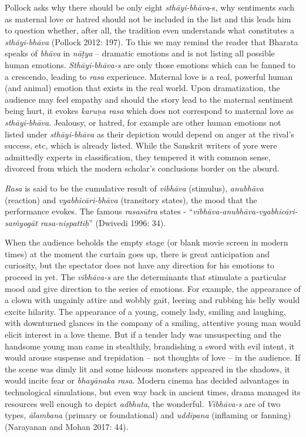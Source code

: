 Pollock asks why there should be only eight \textit{sthāyi-bhāva}-s, why sentiments such as maternal love or hatred should not be included in the list and this leads him to question whether, after all, the tradition even understands what constitutes a \textit{sthāyi-bhāva }(Pollock 2012: 197). To this we may remind the reader that Bharata speaks of \textit{bhāva} in \textit{nāṭya} – dramatic emotions and is not listing all possible human emotions. \textit{Sthāyi-bhāva-s} are only those emotions which can be fanned to a crescendo, leading to \textit{rasa} experience. Maternal love is a real, powerful human (and animal) emotion that exists in the real world. Upon dramatization, the audience may feel empathy and should the story lead to the maternal sentiment being hurt, it evokes \textit{karuṇa rasa} which does not correspond to maternal love as \textit{sthāyi-bhāva}. Jealousy, or hatred, for example are other human emotions not listed under \textit{sthāyi-bhāva} as their depiction would depend on anger at the rival’s success, etc, which is already listed. While the Sanskrit writers of yore were admittedly experts in classification, they tempered it with common sense, divorced from which the modern scholar’s conclusions border on the absurd.

\textit{Rasa} is said to be the cumulative result of \textit{vibhāva} (stimulus), \textit{anubhāva} (reaction) and \textit{vyabhicāri-bhāva} (transitory states), the mood that the performance evokes. The famous \textit{rasasūtra} states - “\textit{vibhāva-anubhāva-vyabhicāri-saṁyogāt rasa-niṣpattiḥ}” (Dwivedi 1996: 34).

When the audience beholds the empty stage (or blank movie screen in modern times) at the moment the curtain goes up, there is great anticipation and curiosity, but the spectator does not have any direction for his emotions to proceed in yet. The \textit{vibhāva-s} are the determinants that stimulate a particular mood and give direction to the series of emotions. For example, the appearance of a clown with ungainly attire and wobbly gait, leering and rubbing his belly would excite hilarity. The appearance of a young, comely lady, smiling and laughing, with downturned glances in the company of a smiling, attentive young man would elicit interest in a love theme. But if a tender lady was unsuspecting and the handsome young man came in stealthily, brandishing a sword with evil intent, it would arouse suspense and trepidation – not thoughts of love – in the audience. If the scene was dimly lit and some hideous monsters appeared in the shadows, it would incite fear or \textit{bhayānaka rasa}. Modern cinema has decided advantages in technological simulations, but even way back in ancient times, drama managed its resources well enough to depict \textit{adbhuta}, the wonderful. \textit{Vibhāva-s }are of two types, \textit{ālambana} (primary or foundational) and \textit{uddīpana }(inflaming or fanning) (Narayanan and Mohan 2017: 44).


